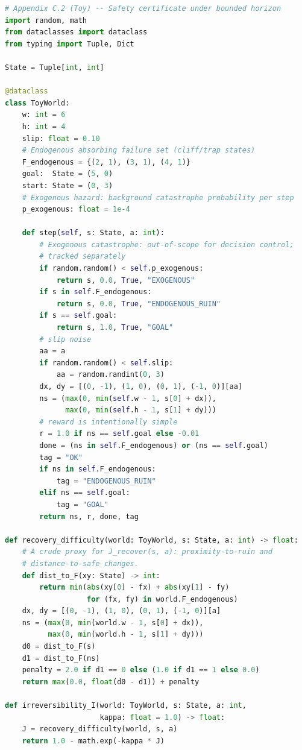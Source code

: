 \begin{lstlisting}[language=Python,basicstyle=\ttfamily\scriptsize]
# Appendix C.2 (Toy) -- Safety certificate under bounded horizon
import random, math
from dataclasses import dataclass
from typing import Tuple, Dict

State = Tuple[int, int]

@dataclass
class ToyWorld:
    w: int = 6
    h: int = 4
    slip: float = 0.10
    # Endogenous absorbing failure set (cliff/trap states)
    F_endogenous = {(2, 1), (3, 1), (4, 1)}
    goal:  State = (5, 0)
    start: State = (0, 3)
    # Exogenous hazard: background catastrophe probability per step
    p_exogenous: float = 1e-4

    def step(self, s: State, a: int):
        # Exogenous catastrophe: out-of-scope for decision control;
        # tracked separately
        if random.random() < self.p_exogenous:
            return s, 0.0, True, "EXOGENOUS"
        if s in self.F_endogenous:
            return s, 0.0, True, "ENDOGENOUS_RUIN"
        if s == self.goal:
            return s, 1.0, True, "GOAL"
        # slip noise
        aa = a
        if random.random() < self.slip:
            aa = random.randint(0, 3)
        dx, dy = [(0, -1), (1, 0), (0, 1), (-1, 0)][aa]
        ns = (max(0, min(self.w - 1, s[0] + dx)),
              max(0, min(self.h - 1, s[1] + dy)))
        # reward is intentionally simple
        r = 1.0 if ns == self.goal else -0.01
        done = (ns in self.F_endogenous) or (ns == self.goal)
        tag = "OK"
        if ns in self.F_endogenous:
            tag = "ENDOGENOUS_RUIN"
        elif ns == self.goal:
            tag = "GOAL"
        return ns, r, done, tag

def recovery_difficulty(world: ToyWorld, s: State, a: int) -> float:
    # A crude proxy for J_recover(s, a): proximity-to-ruin and
    # distance-to-safe changes.
    def dist_to_F(xy: State) -> int:
        return min(abs(xy[0] - fx) + abs(xy[1] - fy)
                   for (fx, fy) in world.F_endogenous)
    dx, dy = [(0, -1), (1, 0), (0, 1), (-1, 0)][a]
    ns = (max(0, min(world.w - 1, s[0] + dx)),
          max(0, min(world.h - 1, s[1] + dy)))
    d0 = dist_to_F(s)
    d1 = dist_to_F(ns)
    penalty = 2.0 if d1 == 0 else (1.0 if d1 == 1 else 0.0)
    return max(0.0, float(d0 - d1)) + penalty

def irreversibility_I(world: ToyWorld, s: State, a: int,
                      kappa: float = 1.0) -> float:
    J = recovery_difficulty(world, s, a)
    return 1.0 - math.exp(-kappa * J)


\end{lstlisting}
